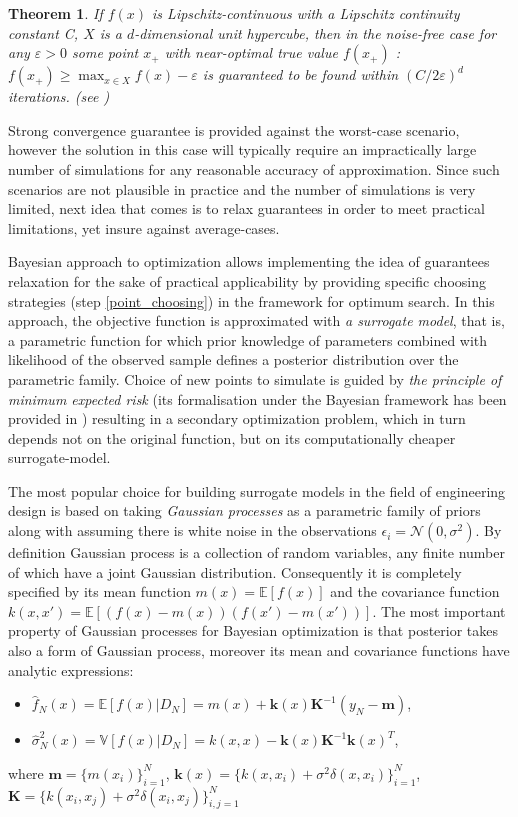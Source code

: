\documentclass[a4paper]{jpconf}
\theoremstyle{my_theorem_style}
\newtheorem{theorem}{Theorem}
\numberwithin{equation}{section}
\begin{document}
\begin{theorem}
If $f(x)$ is Lipschitz-continuous with a Lipschitz continuity constant C, $X$ is a $d$-dimensional unit hypercube, then in the noise-free case for any $\varepsilon  > 0$ some point $x_+$ with near-optimal true value $f(x_+)$ : $f(x_+) \geq \max_{x \in X}f(x) - \varepsilon $ is guaranteed to be found within $(C/2\varepsilon)^d$ iterations. (see \cite{Betro1991})
\end{theorem}

Strong convergence guarantee is provided against the worst-case scenario, however the solution in this case will typically require an impractically large number of simulations for any reasonable accuracy of approximation. Since such scenarios are not plausible in practice and the number of simulations is very limited, next idea that comes is to relax guarantees in order to meet practical limitations, yet insure against average-cases. 

Bayesian approach to optimization allows implementing the idea of guarantees relaxation for the sake of practical applicability by providing specific choosing strategies (step \ref{point_choosing}) in the framework for optimum search. In this approach, the objective function is approximated with \emph{a surrogate model}, that is, a parametric function for which prior knowledge of parameters combined with likelihood of the observed sample defines a posterior distribution over the parametric family. Choice of new points to simulate is guided by \emph{the principle of minimum expected risk} (its formalisation under the Bayesian framework has been provided in \cite{Burnaev2015}) resulting in a secondary optimization problem, which in turn depends not on the original function, but on its computationally cheaper surrogate-model.

The most popular choice for building surrogate models in the field of engineering design is based on taking \emph{Gaussian processes} as a parametric family of priors along with assuming there is white noise in the observations $\epsilon_i = \mathcal{N}(0, \sigma^2)$. By definition \cite{rasmussen2006gaussian,Burnaev2016} Gaussian process is a collection of random variables, any finite number of which have a joint Gaussian distribution. Consequently it is completely specified by its mean function $m(x) = \mathbb{E}[f(x)]$ and the covariance function $k(x, x') = \mathbb{E}[(f(x) - m(x))(f(x') - m(x'))]$. The most important property of Gaussian processes for Bayesian optimization is that posterior takes also a form of Gaussian process, moreover its mean and covariance functions have analytic expressions:
\begin{itemize}
\item $\hat{f}_N(x) = \mathbb{E}[f(x)|D_N] = m(x) + \mathbf{k}(x)\mathbf{K}^{-1} (y_N - \mathbf{m})$,
\item $\hat{\sigma}_N^2(x) = \mathbb{V}[f(x)|D_N] = k(x, x) - \mathbf{k}(x)\mathbf{K}^{-1}\mathbf{k}(x)^T$,
\end{itemize}
where $\mathbf{m} = \{m(x_i)\}_{i=1}^N$, $\mathbf{k}(x) = \{k(x, x_i) + \sigma^2 \delta(x, x_i)\}_{i=1}^N$, $\mathbf{K} = \{k(x_i, x_j) + \sigma^2 \delta(x_i, x_j)\}_{i,j=1}^N$
\end{document}
